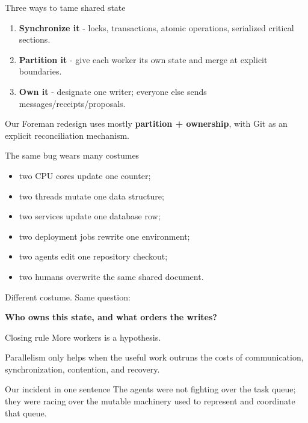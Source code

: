 \documentclass{beamer}
\begin{document}
\begin{frame}{Three ways to tame shared state}
\begin{enumerate}
  \item \textbf{Synchronize it} - locks, transactions, atomic operations, serialized critical sections.
  \item \textbf{Partition it} - give each worker its own state and merge at explicit boundaries.
  \item \textbf{Own it} - designate one writer; everyone else sends messages/receipts/proposals.
\end{enumerate}

\vspace{1em}
Our Foreman redesign uses mostly \textbf{partition + ownership}, with Git as an explicit reconciliation mechanism.
\end{frame}

\begin{frame}{The same bug wears many costumes}
\begin{itemize}
  \item two CPU cores update one counter;
  \item two threads mutate one data structure;
  \item two services update one database row;
  \item two deployment jobs rewrite one environment;
  \item two agents edit one repository checkout;
  \item two humans overwrite the same shared document.
\end{itemize}

\vspace{0.8em}
\centering
\Large Different costume. Same question:

\vspace{0.4em}
\textbf{Who owns this state, and what orders the writes?}
\end{frame}

\begin{frame}{Closing rule}
\Large
More workers is a hypothesis.

\vspace{0.8em}
Parallelism only helps when the useful work outruns the costs of communication, synchronization, contention, and recovery.

\vspace{1em}
\normalsize
\begin{block}{Our incident in one sentence}
The agents were not fighting over the task queue; they were racing over the mutable machinery used to represent and coordinate that queue.
\end{block}
\end{frame}
\end{document}
